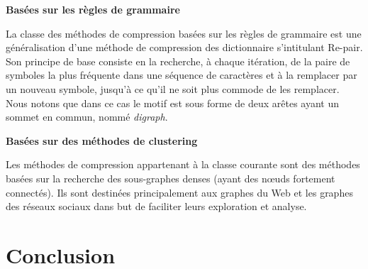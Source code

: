\documentclass[a4paper,oneside,12pt]{report}
\theoremstyle{definition}
\begin{document}
						 \textbf{Basées sur les règles de grammaire} 
								
								La classe des méthodes de compression basées sur les règles de grammaire est une généralisation d'une méthode de compression des dictionnaire s'intitulant Re-pair. Son principe de base consiste en la  recherche, à chaque itération, de la paire de symboles la plus fréquente dans une séquence de caractères et à la remplacer par un nouveau symbole, jusqu'à ce qu'il ne soit plus commode de les remplacer. Nous notons que dans ce cas le motif est sous forme de deux arêtes ayant un sommet en commun, nommé \textit{digraph}.
								
								
								
								
							
								
								
								

								
								
						 \textbf{Basées sur des méthodes de clustering}
						 
						 		Les méthodes de compression appartenant à la classe courante sont des méthodes basées sur la recherche des sous-graphes denses (ayant des nœuds fortement connectés). Ils sont destinées principalement aux graphes du Web et les graphes des réseaux sociaux dans but de faciliter leurs exploration et analyse.
								
								
								
								
						
												
								
		\section{Conclusion}


\end{document}
